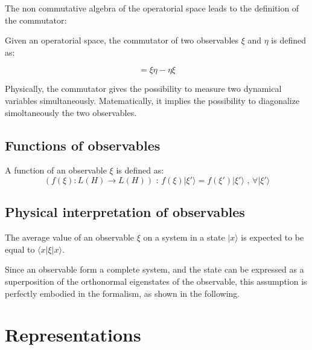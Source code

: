 \documentclass{report}
\begin{document}
The non commutative algebra of the operatorial space leads to the definition of the commutator:

\begin{tcolorbox}[colframe=gray!90, colback=blue!5, coltitle=white, sharp corners, title=\textbf{Definition: Commutator}, fonttitle=\large\bfseries]
  Given an operatorial space, the commutator of two observables $\xi$ and $\eta$ is defined as:

  \begin{equation}
    [\xi,\eta]=\xi\eta-\eta\xi
  \end{equation}
\end{tcolorbox}


Physically, the commutator gives the possibility to measure two dynamical variables simultaneously.
Matematically, it implies the possibility to diagonalize simoltaneously the two observables.

\subsection{Functions of observables}

\begin{tcolorbox}[colframe=gray!90, colback=blue!5, coltitle=white, title= \textbf{Definition}: Function of Observables, fonttitle=\large]
  A function of an observable $\xi$ is defined as:
  \begin{equation}
    \text{$(f(\xi): L(H) \rightarrow L(H))$ : $f(\xi)|\xi'\rangle = f(\xi')|\xi'\rangle $ , $\forall |\xi'\rangle $}
  \end{equation}
\end{tcolorbox}

\subsection{Physical interpretation of observables}

The average value of an observable $\xi$ on a system in a state $|x\rangle $ is expected to be equal to $\langle x|\xi|x\rangle $.

Since an observable form a complete system, and the state can be expressed as a superposition of the orthonormal eigenstates of the observable,
this assumption is perfectly embodied in the formalism, as shown in the following.


\section{Representations}
\end{document}
